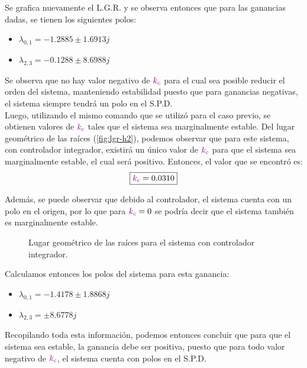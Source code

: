 Se grafica nuevamente el L.G.R. y se observa entonces que para las ganancias dadas,
se tienen los siguientes polos:
\begin{itemize}
    \item $\lambda_{0,1} = -1.2885 \pm 1.6913j$
    \item $\lambda_{2,3} = -0.1288 \pm 8.6988j$
\end{itemize}

Se observa que no hay valor negativo de $\mathbin{\color{violet}k_{c}}$ para el cual sea posible
reducir el orden del sistema, manteniendo estabilidad puesto que para ganancias
negativas, el sistema siempre tendrá un polo en el S.P.D. \\

Luego, utilizando el mismo comando que se utilizó para el caso previo, se obtienen
valores de $\mathbin{\color{violet}k_{c}}$ tales que el sistema sea marginalmente estable. Del lugar
geométrico de las raíces (\autoref{fig:lgr-h2}), podemos observar que para este sistema,
con controlador integrador, existirá un único valor de $\mathbin{\color{violet}k_{c}}$ para que
el sistema sea marginalmente estable, el cual será positivo. Entonces, el valor
que se encontró es:
\begin{equation}
    \boxed{\mathbin{\color{violet}k_{c}} = 0.0310}
\end{equation}

Además, se puede observar que debido al controlador, el sistema cuenta con un
polo en el origen, por lo que para $\mathbin{\color{violet}k_{c}} = 0$ se podría decir que el
sistema también es marginalmente estable.

\begin{figure}[ht]
    \centering
    
    \caption{Lugar geométrico de las raíces para el sistema con controlador integrador.}
    \label{fig:lgr-h2}
\end{figure}

Calculamos entonces los polos del sistema para esta ganancia:
\begin{itemize}
    \item $\lambda_{0,1} = -1.4178 \pm 1.8868j$
    \item $\lambda_{2,3} = \pm 8.6778j$ \\
\end{itemize}

Recopilando toda esta información, podemos entonces concluir que para que el
sistema sea estable, la ganancia debe ser positiva, puesto que para todo valor
negativo de $\mathbin{\color{violet}k_{c}}$, el sistema cuenta con polos en el S.P.D.

